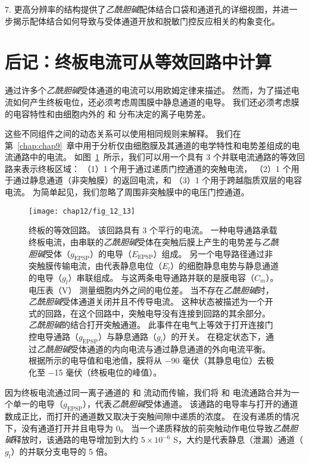 7. 更高分辨率的结构提供了\textit{乙酰胆碱}配体结合口袋和通道孔的详细视图，并进一步揭示配体结合如何导致与受体通道开放和脱敏门控反应相关的构象变化。


\section{后记：终板电流可从等效回路中计算}

通过许多个\textit{乙酰胆碱}受体通道的电流可以用欧姆定律来描述。
然而，为了描述电流如何产生终板电位，还必须考虑周围膜中静息通道的电导。
我们还必须考虑膜的电容特性和由细胞内外的  和  分布决定的离子电势差。


这些不同组件之间的动态关系可以使用相同规则来解释。
我们在第~\ref{chap:chap9}~章中用于分析仅由细胞膜及其通道的电学特性和电势差组成的电流通路中的电流。
如图~\ref{fig:12_13}~所示，我们可以用一个具有 3 个并联电流通路的等效回路来表示终板区域：
（1）1 个用于通过递质门控通道的突触电流，
（2）1 个用于通过静息通道（非突触膜）的返回电流，和
（3）1 个用于跨越脂质双层的电容电流。
为简单起见，我们忽略了周围非突触膜中的电压门控通道。


\begin{figure}[htbp]
	\centering
	\texttt{[image: chap12/fig\_12\_13]}
	\caption{终板的等效回路。
		该回路具有 3 个平行的电流。
		一种电导通路承载终板电流，由串联的\textit{乙酰胆碱}受体在突触后膜上产生的电势差与\textit{乙酰胆碱}受体（$ g_{\text{EPSP}} $）的电导（$E_{\text{EPSP}}$）组成。
		另一个电导路径通过非突触膜传输电流，由代表静息电位（$ E_l $）的细胞静息电势与静息通道的电导（$ g_l $）串联组成。
		与这两条电导通路并联的是膜电容（$ C_m $）。
		电压表（V） 测量细胞内外之间的电位差。
		当不存在\textit{乙酰胆碱}时，\textit{乙酰胆碱}受体通道关闭并且不传导电流。
		这种状态被描述为一个开式的回路，在这个回路中，突触电导没有连接到回路的其余部分。
		\textit{乙酰胆碱}的结合打开突触通道。
		此事件在电气上等效于打开连接门控电导通路（$ g_{\text{EPSP}} $）与静息通路（$ g_l $）的开关。
		在稳定状态下，通过\textit{乙酰胆碱}受体通道的内向电流与通过静息通道的外向电流平衡。
		根据所示的电导值和电池值，膜将从 −90 毫伏（其静息电位）去极化至 −15 毫伏（终板电位的峰值）。}
	\label{fig:12_13}
\end{figure}


因为终板电流通过同一离子通道的  和 流动而传输，我们将  和  电流通路合并为一个单一的电导（$ g_{\text{EPSP}} $），代表\textit{乙酰胆碱}受体通道。
该通路的电导率与打开的通道数成正比，而打开的通道数又取决于突触间隙中递质的浓度。
在没有递质的情况下，没有通道打开并且电导为 0。
当一个递质释放的前突触动作电位导致\textit{乙酰胆碱}释放时，该通路的电导增加到大约 $ 5 \times 10^{-6} $ S，大约是代表静息（泄漏）通道（$ g_l $）的并联分支电导的 5 倍。


